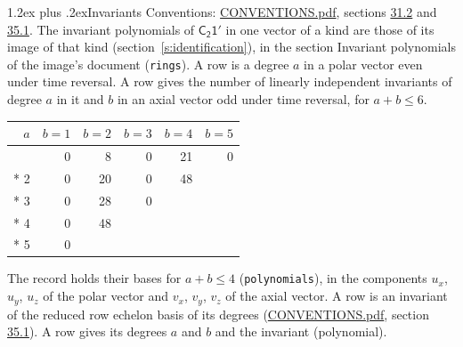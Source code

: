 \documentclass[10pt,a4paper]{article}
\makeatletter
\renewcommand\section{\@startsection{section}{1}{\z@}{-3ex plus -1ex minus -.2ex}%
  {1.2ex plus .2ex}{\normalfont\large\sffamily\bfseries\color{parttitle}}}
\numberwithin{equation}{section}
\newcommand{\grp}[1]{\mathsf{#1}}
\makeatother
\begin{document}
\section{Invariants}\label{s:invariants}
Conventions: \href{../../CONVENTIONS.pdf}{CONVENTIONS.pdf}, sections \href{../../CONVENTIONS.pdf\#conv.31.2}{31.2} and \href{../../CONVENTIONS.pdf\#conv.35.1}{35.1}.
The invariant polynomials of $\grp{C_{2}1'}$ in one vector of a kind are those of its image of that kind (section~\ref{s:identification}), in the section Invariant polynomials of the image's document (\texttt{rings}).
\leavevmode\label{n:index.degree.polar}\label{n:index.degree.axial}A row is a degree $a$ in a polar vector even under time reversal. A row gives the number of linearly independent invariants of degree $a$ in it and $b$ in an axial vector odd under time reversal, for $a + b \le 6$.
{\small\begin{longtable}{@{}rrrrrr@{}}\toprule
$a$ & $b = 1$ & $b = 2$ & $b = 3$ & $b = 4$ & $b = 5$\\\midrule\endhead
\bottomrule\endfoot\endlastfoot
1 & 0 & 8 & 0 & 21 & 0\\*
2 & 0 & 20 & 0 & 48 & \\*
3 & 0 & 28 & 0 &  & \\*
4 & 0 & 48 &  &  & \\*
5 & 0 &  &  &  & \\
\bottomrule\end{longtable}}
\leavevmode\label{n:local.component.polar}\label{n:local.component.axial}The record holds their bases for $a + b \le 4$ (\texttt{polynomials}), in the components $u_{x}$, $u_{y}$, $u_{z}$ of the polar vector and $v_{x}$, $v_{y}$, $v_{z}$ of the axial vector. \label{n:head.polynomial}A row is an invariant of the reduced row echelon basis of its degrees (\href{../../CONVENTIONS.pdf}{CONVENTIONS.pdf}, section \href{../../CONVENTIONS.pdf\#conv.35.1}{35.1}). A row gives its degrees $a$ and $b$ and the invariant (polynomial).
\end{document}
